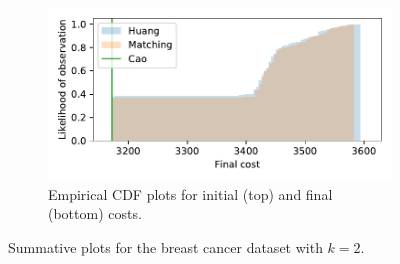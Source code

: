 \documentclass[smallextended]{svjour3}
\begin{document}
\begin{figure}
\begin{subfigure}{.5\textwidth}
        \includegraphics[width=\linewidth]{Fig5b2.pdf}
        \caption{Empirical CDF plots for initial (top) and final (bottom)
                 costs.}
    \end{subfigure}
    \caption{Summative plots for the breast cancer dataset with \(k=2\).}%
    \label{fig:breast_cancer_nclasses}
\end{figure}
\end{document}
